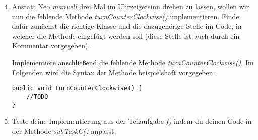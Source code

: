 \begin{enumerate}[label=\alph*)] \setcounter{enumi}{3}
    \item Anstatt Neo \textit{manuell} drei Mal im Uhrzeigersinn drehen zu lassen, wollen wir nun die fehlende Methode \textit{turnCounterClockwise()}
    implementieren. Finde dafür zunächst die richtige Klasse und die dazugehörige Stelle im Code, in welcher die Methode eingefügt werden soll (diese Stelle ist auch durch ein Kommentar vorgegeben). \par
    Implementiere anschließend die fehlende Methode \textit{turnCounterClockwise()}. Im Folgenden wird die Syntax der Methode beispielshaft vorgegeben:
    \begin{lstlisting}
public void turnCounterClockwise() {
    //TODO
}
    \end{lstlisting}
    \item Teste deine Implementierung aus der Teilaufgabe \textit{f)} indem du deinen Code in der Methode \textit{subTaskC()} anpasst.
\end{enumerate}

